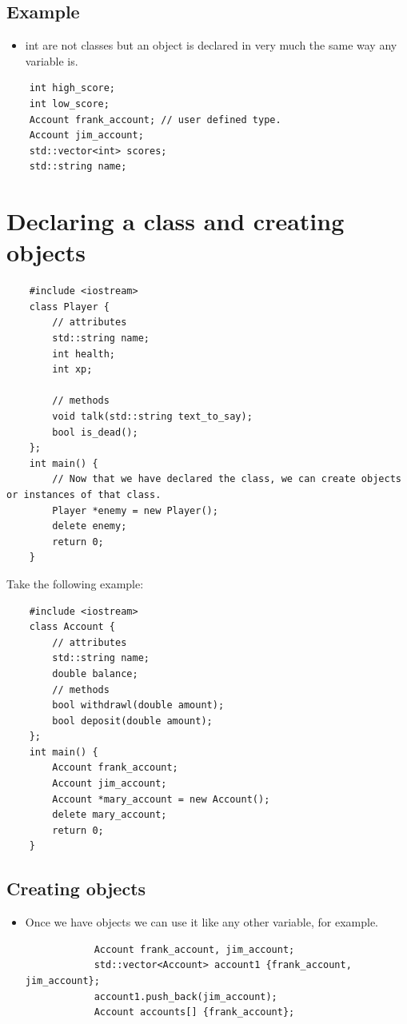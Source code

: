\subsection{Example}
\begin{itemize}
    \item int are not classes but an object is declared in very much the same way any variable is.
\end{itemize}
\begin{verbatim}
    int high_score;
    int low_score;
    Account frank_account; // user defined type.
    Account jim_account;
    std::vector<int> scores;
    std::string name;
\end{verbatim}


\section{Declaring a class and creating objects}
\begin{verbatim}
    #include <iostream>
    class Player {
        // attributes
        std::string name;
        int health;
        int xp;

        // methods
        void talk(std::string text_to_say);
        bool is_dead();
    };
    int main() {
        // Now that we have declared the class, we can create objects or instances of that class.
        Player *enemy = new Player();
        delete enemy;
        return 0;
    }
\end{verbatim}

Take the following example:
\begin{verbatim}
    #include <iostream>
    class Account {
        // attributes
        std::string name;
        double balance;
        // methods
        bool withdrawl(double amount);
        bool deposit(double amount);
    };
    int main() {
        Account frank_account;
        Account jim_account;
        Account *mary_account = new Account();
        delete mary_account;
        return 0;
    }
\end{verbatim}

\subsection{Creating objects}
\begin{itemize}
    \item Once we have objects we can use it like any other variable, for example.
        \begin{verbatim}
            Account frank_account, jim_account;
            std::vector<Account> account1 {frank_account, jim_account};
            account1.push_back(jim_account);
            Account accounts[] {frank_account};
        \end{verbatim}
\end{itemize}

